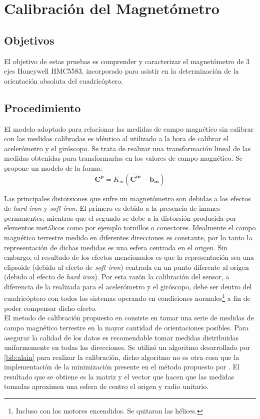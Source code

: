 \documentclass[main]{subfiles}
\begin{document}
\chapter{Calibraci\'on del Magnetómetro}
\label{chap:magnetometro}

\section{Objetivos}

El objetivo de estas pruebas es comprender y caracterizar el magnetómetro de 3 ejes Honeywell HMC5583, incorporado para asistir en la determinación de la orientación absoluta del cuadricóptero.

\section{Procedimiento}
\label{sec:procedimiento}

El modelo adoptado para relacionar las medidas de campo magnético sin calibrar con las medidas calibradas es idéntico al utilizado a la hora de calibrar el acelerómetro y el giróscopo. Se trata de realizar una transformación lineal de las medidas obtenidas para transformarlas en los valores de campo magnético. Se propone un modelo de la forma:
$$
\mathbf{C^p} =K_m (\mathbf{\tilde{C^m}} -  \mathbf{b_m})
$$

Las principales distorsiones que sufre un magnet\'ometro son debidas a los efectos de \emph{hard iron} y \emph{soft iron}. El primero es debido a la presencia de imanes permanentes, mientras que el segundo se debe a la distorsi\'on producida por elementos met\'alicos como por ejemplo tornillos o conectores. Idealmente el campo magn\'etico terrestre medido en diferentes direcciones es constante, por lo tanto la representaci\'on de dichas medidas es una esfera centrada en el origen. Sin embargo, el resultado de los efectos mencionados es que la representaci\'on sea una elipsoide (debido al efecto de \emph{soft iron}) centrada en un punto diferente al origen (debido al efecto de \emph{hard iron}). Por esta raz\'on la calibraci\'on del sensor, a diferencia de la realizada para el aceler\'ometro y el gir\'oscopo, debe ser dentro del cuadric\'optero con todos los sistemas operando en condiciones normales\footnote{Incluso con los motores encendidos. Se quitaron las h\'elices.} a fin de poder compensar dicho efecto.\\


El metodo de calibraci\'on propuesto en \cite{bib:bola} consiste en tomar una serie de medidas de campo magnético terrestre en la mayor cantidad de  orientaciones posibles. Para asegurar la calidad de los datos es recomendable tomar medidas distribuidas uniformemente en todas las direcciones. Se utilizó un algoritmo desarrollado por \ref{bib:alain} para realizar la calibración, dicho algoritmo no es otra cosa que la implementación de la minimización presente en el método propuesto por \cite{bib:bola}. El resultado que se obtiene es la matriz y el vector que hacen que las medidas tomadas aproximen una esfera de centro el origen y radio unitario.\\
\end{document}
